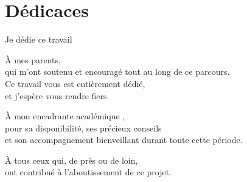 \chapter*{Dédicaces}
\thispagestyle{plain}

\vspace{1cm}

\begin{center}
\itshape\large

Je dédie ce travail

\vspace{0.8cm}

À mes parents,\\
qui m'ont soutenu et encouragé tout au long de ce parcours.\\
Ce travail vous est entièrement dédié,\\
et j'espère vous rendre fiers.

\vspace{1.2cm}

À mon encadrante académique \supervisor,\\
pour sa disponibilité, ses précieux conseils\\
et son accompagnement bienveillant durant toute cette période.

\vspace{1.2cm}

À tous ceux qui, de près ou de loin,\\
ont contribué à l'aboutissement de ce projet.

\end{center}

\vfill
